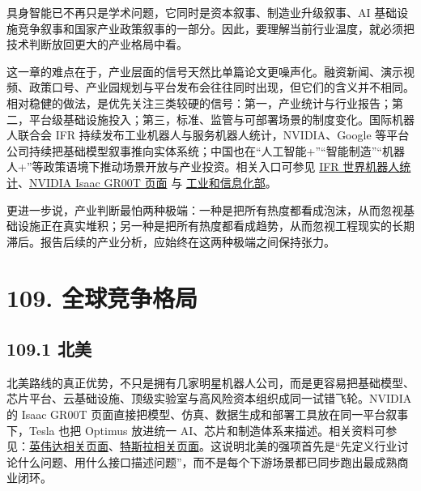 

具身智能已不再只是学术问题，它同时是资本叙事、制造业升级叙事、AI 基础设施竞争叙事和国家产业政策叙事的一部分。因此，要理解当前行业温度，就必须把技术判断放回更大的产业格局中看。

这一章的难点在于，产业层面的信号天然比单篇论文更噪声化。融资新闻、演示视频、政策口号、产业园规划与平台发布会往往同时出现，但它们的含义并不相同。相对稳健的做法，是优先关注三类较硬的信号：第一，产业统计与行业报告；第二，平台级基础设施投入；第三，标准、监管与可部署场景的制度变化。国际机器人联合会 IFR 持续发布工业机器人与服务机器人统计，NVIDIA、Google 等平台公司持续把基础模型叙事推向实体系统；中国也在“人工智能+”“智能制造”“机器人+”等政策语境下推动场景开放与产业投资。相关入口可参见 \href{https://ifr.org/worldrobotics/}{IFR 世界机器人统计}、\href{https://developer.nvidia.com/isaac/gr00t}{NVIDIA Isaac GR00T 页面} 与 \href{https://www.miit.gov.cn/}{工业和信息化部}。

更进一步说，产业判断最怕两种极端：一种是把所有热度都看成泡沫，从而忽视基础设施正在真实堆积；另一种是把所有热度都看成趋势，从而忽视工程现实的长期滞后。报告后续的产业分析，应始终在这两种极端之间保持张力。

\section*{109. 全球竞争格局}

\subsection*{109.1 北美}


北美路线的真正优势，不只是拥有几家明星机器人公司，而是更容易把基础模型、芯片平台、云基础设施、顶级实验室与高风险资本组织成同一试错飞轮。NVIDIA 的 Isaac GR00T 页面直接把模型、仿真、数据生成和部署工具放在同一平台叙事下，Tesla 也把 Optimus 放进统一 AI、芯片和制造体系来描述。相关资料可参见：\href{https://developer.nvidia.com/isaac/gr00t}{英伟达相关页面}、\href{https://www.tesla.com/AI}{特斯拉相关页面}。这说明北美的强项首先是“先定义行业讨论什么问题、用什么接口描述问题”，而不是每个下游场景都已同步跑出最成熟商业闭环。

